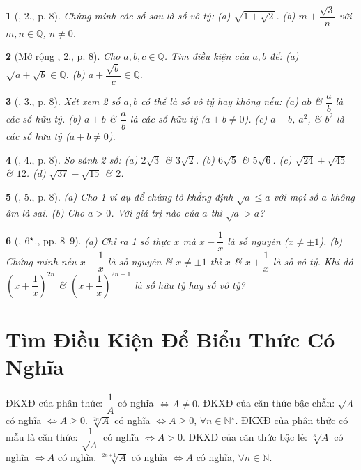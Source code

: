\documentclass{article}
\newtheorem{baitoan}{}
\begin{document}
\begin{baitoan}[\cite{Binh_Toan_9_tap_1}, 2., p. 8]
	Chứng minh các số sau là số vô tỷ: (a) $\sqrt{1 + \sqrt{2}}$. (b) $m + \dfrac{\sqrt{3}}{n}$ với $m,n\in\mathbb{Q}$, $n\ne0$.
\end{baitoan}

\begin{baitoan}[Mở rộng \cite{Binh_Toan_9_tap_1}, 2., p. 8]
	Cho $a,b,c\in\mathbb{Q}$. Tìm điều kiện của $a,b$ để: (a) $\sqrt{a + \sqrt{b}}\in\mathbb{Q}$. (b) $a + \dfrac{\sqrt{b}}{c}\in\mathbb{Q}$.
\end{baitoan}

\begin{baitoan}[\cite{Binh_Toan_9_tap_1}, 3., p. 8]
	Xét xem 2 số $a,b$ có thể là số vô tỷ hay không nếu: (a) $ab$ \& $\dfrac{a}{b}$ là các số hữu tỷ. (b) $a + b$ \& $\dfrac{a}{b}$ là các số hữu tỷ ($a + b\ne0$). (c) $a + b$, $a^2$, \& $b^2$ là các số hữu tỷ ($a + b\ne0$).
\end{baitoan}

\begin{baitoan}[\cite{Binh_Toan_9_tap_1}, 4., p. 8]
	So sánh 2 số: (a) $2\sqrt{3}$ \& $3\sqrt{2}$. (b) $6\sqrt{5}$ \& $5\sqrt{6}$. (c) $\sqrt{24} + \sqrt{45}$ \& $12$. (d) $\sqrt{37} - \sqrt{15}$ \& $2$.
\end{baitoan}

\begin{baitoan}[\cite{Binh_Toan_9_tap_1}, 5., p. 8]
	(a) Cho 1 ví dụ để chứng tỏ khẳng định $\sqrt{a}\le a$ với mọi số $a$ không âm là sai. (b) Cho $a > 0$. Với giá trị nào của $a$ thì $\sqrt{a} > a$?
\end{baitoan}

\begin{baitoan}[\cite{Binh_Toan_9_tap_1}, $\rm6^\star$., pp. 8--9]
	(a) Chỉ ra 1 số thực $x$ mà $x - \dfrac{1}{x}$ là số nguyên ($x\ne\pm1$). (b) Chứng minh nếu $x - \dfrac{1}{x}$ là số nguyên \& $x\ne\pm1$ thì $x$ \& $x + \dfrac{1}{x}$ là số vô tỷ. Khi đó $\left(x + \dfrac{1}{x}\right)^{2n}$ \& $\left(x + \dfrac{1}{x}\right)^{2n+1}$ là số hữu tỷ hay số vô tỷ?
\end{baitoan}


\section{Tìm Điều Kiện Để Biểu Thức Có Nghĩa}
 {\sf ĐKXĐ của phân thức}: $\dfrac{1}{A}$ có nghĩa $\Leftrightarrow A\ne0$.  {\sf ĐKXĐ của căn thức bậc chẵn}: $\sqrt{A}$ có nghĩa $\Leftrightarrow A\ge0$. $\sqrt[2n]{A}$ có nghĩa $\Leftrightarrow A\ge0$, $\forall n\in\mathbb{N}^\star$.  {\sf ĐKXĐ của phân thức có mẫu là căn thức}: $\dfrac{1}{\sqrt{A}}$ có nghĩa $\Leftrightarrow A > 0$.  {\sf ĐKXĐ của căn thức bậc lẻ}: $\sqrt[3]{A}$ có nghĩa $\Leftrightarrow A$ có nghĩa. $\sqrt[2n + 1]{A}$ có nghĩa $\Leftrightarrow A$ có nghĩa, $\forall n\in\mathbb{N}$.
\end{document}
